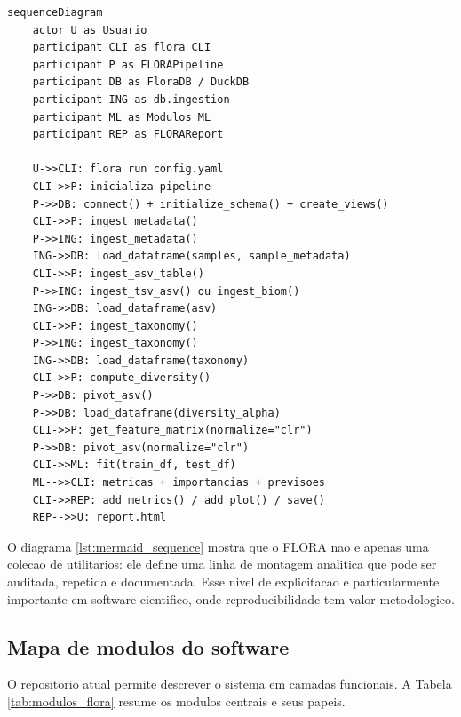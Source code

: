 \documentclass[12pt,a4paper]{article}
\begin{document}
\begin{lstlisting}[style=mermaid,caption={Diagrama Mermaid de sequencia para uma corrida completa do FLORA.},label={lst:mermaid_sequence}]
sequenceDiagram
    actor U as Usuario
    participant CLI as flora CLI
    participant P as FLORAPipeline
    participant DB as FloraDB / DuckDB
    participant ING as db.ingestion
    participant ML as Modulos ML
    participant REP as FLORAReport

    U->>CLI: flora run config.yaml
    CLI->>P: inicializa pipeline
    P->>DB: connect() + initialize_schema() + create_views()
    CLI->>P: ingest_metadata()
    P->>ING: ingest_metadata()
    ING->>DB: load_dataframe(samples, sample_metadata)
    CLI->>P: ingest_asv_table()
    P->>ING: ingest_tsv_asv() ou ingest_biom()
    ING->>DB: load_dataframe(asv)
    CLI->>P: ingest_taxonomy()
    P->>ING: ingest_taxonomy()
    ING->>DB: load_dataframe(taxonomy)
    CLI->>P: compute_diversity()
    P->>DB: pivot_asv()
    P->>DB: load_dataframe(diversity_alpha)
    CLI->>P: get_feature_matrix(normalize="clr")
    P->>DB: pivot_asv(normalize="clr")
    CLI->>ML: fit(train_df, test_df)
    ML-->>CLI: metricas + importancias + previsoes
    CLI->>REP: add_metrics() / add_plot() / save()
    REP-->>U: report.html
\end{lstlisting}

O diagrama \ref{lst:mermaid_sequence} mostra que o FLORA nao e apenas uma colecao de utilitarios: ele define uma linha de montagem analitica que pode ser auditada, repetida e documentada. Esse nivel de explicitacao e particularmente importante em software cientifico, onde reproducibilidade tem valor metodologico.

\subsection{Mapa de modulos do software}

O repositorio atual permite descrever o sistema em camadas funcionais. A Tabela \ref{tab:modulos_flora} resume os modulos centrais e seus papeis.
\end{document}
